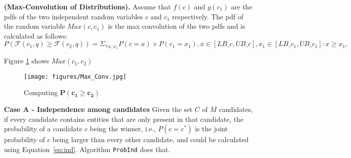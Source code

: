 \begin{definition}
{\bf (Max-Convolution of Distributions).}
Assume that $f(c)$ and $g(c_1)$ are the pdfs of the two independent random variables $c$ and $c_1$ respectively. The pdf of the random variable $Max(c, c_1)$ is the max convolution of the two pdfs and is calculated as follows:
$P\left(\mathcal{F}(c_1, q) \geq \mathcal{F}(c_2, q)\right)  = \Sigma_{\forall x, x_1} P(c=x) \times P(c_1=x_1),{ x \in [LB\_c, UB\_c], x_1 \in [LB\_{c_1}, UB\_{c_1}] : x \geq x_1,} $
\end{definition}
Figure \ref{fig:max_conv} shows $Max(c_1, c_2)$ 

\begin{figure}[ht]
    \centering
    \texttt{[image: figures/Max\_Conv.jpg]}
    \caption{Computing \(\mathbf{P(c_1 \geq c_2)}\)}
    \label{fig:max_conv}
\end{figure}



\begin{comment}
In order to find this probability, we consider two different cases. 

\textbf{Case 1 - Independence assumption}: In this case, we assume that the candidates are independent. Hence, we can compute $P(c = c^*)$ as follows:


\[
P(c = c^*) = \prod_{c' \in C} P(\mathcal{F}(c, q) \geq \mathcal{F}(c', q))
\]

\textbf{\textcolor{red}{An example needs to be added here}}

\end{comment}


\noindent \textbf{Case A - Independence among candidates}
Given the set $C$ of $M$ candidates, if every candidate contains entities that are only present in that candidate, the probability of a candidate $c$ being the winner, i.e., $P(c = c^*)$ is the joint probability of $c$ being larger than every other candidate, and could be calculated using Equation~\ref{eq:ind}. Algorithm {\tt ProbInd} does that.


